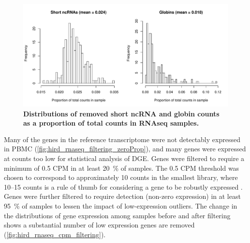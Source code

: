 \begin{figure}
    \centering
    \includegraphics[width=1.0\textwidth, page=1]{mainmatter/figures/chapter_02/rnaseq_data_setup.per_sample.short_ncRNA_globin_levels_hist.pdf}
    \caption{\textbf{Distributions of removed short \gls{ncRNA} and globin counts as a proportion of total counts in \gls{RNAseq} samples.}}
    \label{fig:hird_shortncRNA_and_globins}
\end{figure}

Many of the genes in the reference transcriptome were not detectably expressed in \gls{PBMC} (\cref{fig:hird_rnaseq_filtering_zeroProp}), and many genes were expressed at counts too low for statistical analysis of \gls{DGE}.
Genes were filtered to require a minimum of 0.5 \gls{CPM} in at least \SI{20}{\percent} of samples.
The 0.5 \gls{CPM} threshold was chosen to correspond to approximately 10 counts in the smallest library, where \numrange{10}{15} counts is a rule of thumb for considering a gene to be robustly expressed \autocite{chen2016ReadsGenesPathways,law2018RNAseqAnalysisEasy}.
Genes were further filtered to require detection (non-zero expression) in at least \SI{95}{\percent} of samples to lessen the impact of low-expression outliers.
The change in the distributions of gene expression among samples before and after filtering shows a substantial number of low expression genes are removed (\cref{fig:hird_rnaseq_cpm_filtering}).

